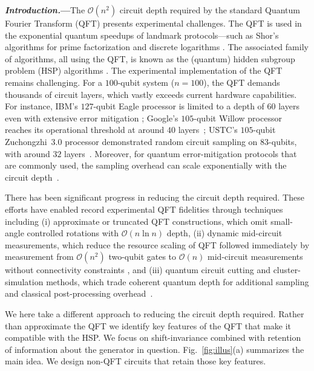 \documentclass[reprint, aps, prl, superscriptaddress]{revtex4-2}
\renewcommand{\section}[1]{\par\medskip\noindent\textbf{{\textit{#1.}---}}}
\begin{document}
\section{Introduction}The $\mathcal{O}(n^2)$ circuit depth required by the standard Quantum Fourier Transform (QFT) presents experimental challenges. The QFT is used in the exponential quantum speedups of landmark protocols—such as Shor's algorithms for prime factorization and discrete logarithms \cite{Simon1997, Shor1994, Shor1997}. The associated family of algorithms, all using the QFT, is known as the (quantum) hidden subgroup problem (HSP) algorithms \cite{Kitaev1995, Jozsa2001, Lomont2004, liu2024information}. The experimental implementation of the QFT remains challenging. For a $100$-qubit system ($n=100$), the QFT demands thousands of circuit layers, which vastly exceeds current hardware capabilities. For instance, IBM's $127$-qubit Eagle processor is limited to a depth of $60$ layers even with extensive error mitigation \cite{kim2023evidence}; Google's $105$-qubit Willow processor reaches its operational threshold at around $40$ layers~\cite{google2025quantum}; USTC's $105$-qubit Zuchongzhi~3.0 processor demonstrated random circuit sampling on $83$-qubits, with around $32$ layers~\cite{Zuchongzhi}. Moreover, for quantum error-mitigation protocols that are commonly used, the sampling overhead can scale exponentially with the circuit depth~\cite{takagi2022fundamental, takagi2023universal}.


There has been significant progress in reducing the circuit depth required. These efforts have enabled record experimental QFT fidelities \cite{aumann2026demonstrating} through techniques including (i) approximate or truncated QFT constructions, which omit small-angle controlled rotations \cite{Coppersmith2002, park2023reducing} with \(\mathcal{O}(n\ln n)\) depth, (ii) dynamic mid-circuit measurements, which reduce the resource scaling of QFT followed immediately by measurement from \(\mathcal{O}(n^2)\) two-qubit gates to \(\mathcal{O}(n)\) mid-circuit measurements without connectivity constraints \cite{baumer2024quantum}, and (iii) quantum circuit cutting and cluster-simulation methods, which trade coherent quantum depth for additional sampling and classical post-processing overhead~\cite{tang2021cutqc, Peng2020}. 

We here take a different approach to reducing the circuit depth required. Rather than approximate the QFT we identify key features of the QFT that make it compatible with the HSP. We focus on shift-invariance combined with retention of information about the generator in question. Fig.~\ref{fig:illus}(a) summarizes the main idea. We design non-QFT circuits that retain those key features. 
\end{document}

